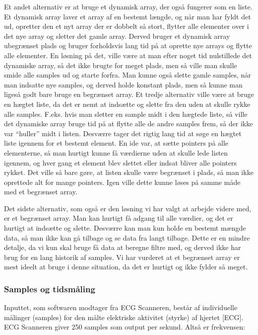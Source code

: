 \documentclass{article}
\begin{document}
Et andet alternativ er at bruge et dynamisk array, der også fungerer som en liste. Et dynamisk array laver et array af en bestemt længde, og når man har fyldt det ud, opretter den et nyt array der er dobbelt så stort, flytter alle elementer over i det nye array og sletter det gamle array. Derved bruger et dynamisk array ubegrænset plads og bruger forholdsvis lang tid på at oprette nye arrays og flytte alle elementer. En løsning på det, ville være at man efter noget tid nulstillede det dynamiske array, så det ikke brugte for meget plads, men så ville man skulle smide alle samples ud og starte forfra. Man kunne også slette gamle samples, når man indsatte nye samples, og derved holde konstant plads, men så kunne man ligeså godt bare bruge en begrænset array.
Et tredje alternativ ville være at bruge en hægtet liste, da det er nemt at indsætte og slette fra den uden at skulle rykke alle samples. F.eks. hvis man sletter en sample midt i den hægtede liste, så ville det dynamiske array bruge tid på at flytte alle de andre samples frem, så der ikke var “huller” midt i listen. Desværre tager det rigtig lang tid at søge en hægtet liste igennem for et bestemt element. En ide var, at sætte pointers på alle elementerne, så man hurtigt kunne få værdierne uden at skulle lede listen igennem, og hver gang et element blev slettet eller indsat bliver alle pointers rykket. Det ville så bare gøre, at listen skulle være begrænset i plads, så man ikke oprettede alt for mange pointers. Igen ville dette kunne løses på samme måde med et begrænset array.

Det sidste alternativ, som også er den løsning vi har valgt at arbejde videre med, er et begrænset array. Man kan hurtigt få adgang til alle værdier, og det er hurtigt at indsætte og slette. Desværre kan man kun holde en bestemt mængde data, så man ikke kan gå tilbage og se data fra langt tilbage. Dette er en mindre detalje, da vi kun skal bruge få data at beregne filtre med, og derved ikke har brug for en lang historik af samples. 
Vi har vurderet at et begrænset array er mest ideelt at bruge i denne situation, da det er hurtigt og ikke fylder så meget.

\subsubsection{Samples og tidsmåling}
Inputtet, som softwaren modtager fra ECG Scanneren, består af individuelle målinger (samples) for den målte elektriske aktivitet (styrke) af hjertet [ECG]. ECG Scanneren giver 250 samples som output per sekund. Altså er frekvensen:
\end{document}
